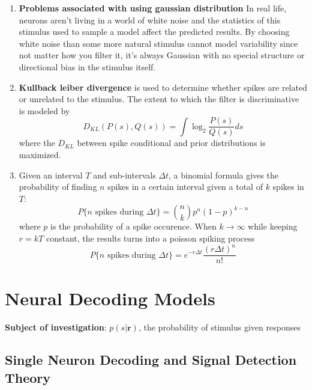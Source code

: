 \documentclass[11pt]{article}
\begin{document}
\begin{enumerate}
    \item \textbf{Problems associated with using gaussian distribution} In real life, neurons aren't living in a world of white noise and the statistics of this stimulus used to sample a model affect the predicted results. By choosing white noise than some more natural stimulus cannot model variability since not matter how you filter it, it's always Gaussian with no special structure or directional bias in the stimulus itself.
    \item \textbf{Kullback leiber divergence} is used to determine whether spikes are related or unrelated to the stimulus. The extent to which the filter is discriminative is modeled by \begin{equation*}
        D_{KL}(P(s),Q(s))=\int \log_2 \frac{P(s)}{Q(s)} ds
    \end{equation*}
    where the $D_{KL}$ between spike conditional and prior distributions is maximized.
    \item Given an interval $T$ and sub-intervals $\Delta t$, a binomial formula gives the probability of finding $n$ spikes in a certain interval given a total of $k$ spikes in $T$:\begin{equation*}
        P\{n\text{ spikes during $\Delta t$}\}=\binom{n}{k}p^{n}(1-p)^{k-n} 
    \end{equation*}where $p$ is the probability of a spike occurence. When $k\to \infty$ while keeping $r=kT$ constant, the results turns into a poisson spiking process
    \begin{equation*}
        P\{n\text{ spikes during $\Delta t$}\}=e^{-r\Delta t}\frac{(r\Delta t)^n}{n!}
    \end{equation*}
\end{enumerate}

\newpage
\section{Neural Decoding Models}
\noindent \textbf{Subject of investigation}: $p(s|\mathbf{r})$, the probability of stimulus given responses

\subsection{Single Neuron Decoding and Signal Detection Theory}
\end{document}
